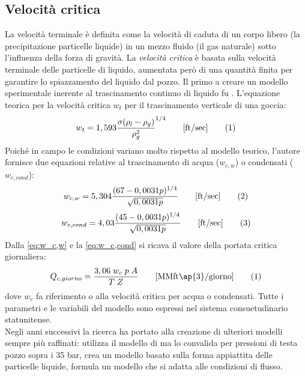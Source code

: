 \subsection{Velocità critica}
La velocità terminale è definita come la velocità di caduta di un corpo libero (la precipitazione particelle liquide) in un mezzo fluido (il gas naturale) sotto l'influenza della forza di gravità. La \textit{velocità critica} è basata sulla velocità terminale delle particelle di liquido, aumentata però di una quantità finita per garantire lo spiazzamento del liquido dal pozzo. Il primo a creare un modello sperimentale inerente al trascinamento continuo di liquido fu \textcite{turner1969analysis}. L'equazione teorica per la velocità critica \(w_t\) per il trascinamento verticale di una goccia:
\[w_t= 1,593\dfrac{\sigma{(\rho_l-\rho_g)}}{\rho_g^2}^{1/4} \qquad\textrm{[ft/sec]} \addtag \label{eq:turnerwc} \]
Poiché in campo le condizioni variano molto rispetto al modello teorico, l'autore fornisce due equazioni relative al trascinamento di acqua (\(w_{c,w}\)) o condensati (\(w_{c,cond}\)):
\[w_{c,w} = 5,304 \dfrac{(67-0,0031p)^{1/4}}{\sqrt{0,0031p}}  \qquad\textrm{[ft/sec]} \label{eq:w_c,w} \addtag\]
\[w_{c,cond} = 4,03 \dfrac{(45-0,0031p)^{1/4}}{\sqrt{0,0031p}}  \qquad\textrm{[ft/sec]} \label{eq:w_c,cond} \addtag\]
Dalla \eqref{eq:w_c,w} e la \eqref{eq:w_c,cond} si ricava il valore della portata critica giornaliera:
\[Q_{c,giorno}=\dfrac{3,06 \; w_c \; p \; A}{T \; Z}  \qquad \textrm{[MMft\ap{3}/giorno]} \addtag \]
dove \(w_c\) fa riferimento o alla velocità critica per acqua o condensati. Tutte i parametri e le variabili del modello sono espressi nel sistema consuetudinario statunitense. \\
Negli anni successivi la ricerca ha portato alla creazione di ulteriori modelli sempre più raffinati: \textcite{coleman1991new} utilizza il modello di \citeauthor{turner1969analysis} ma lo convalida per pressioni di testa pozzo sopra i 35 bar, \textcite{li2001new} crea un modello basato sulla forma appiattita delle particelle liquide, \textcite{nosseir1997new} formula un modello che si adatta alle condizioni di flusso.

